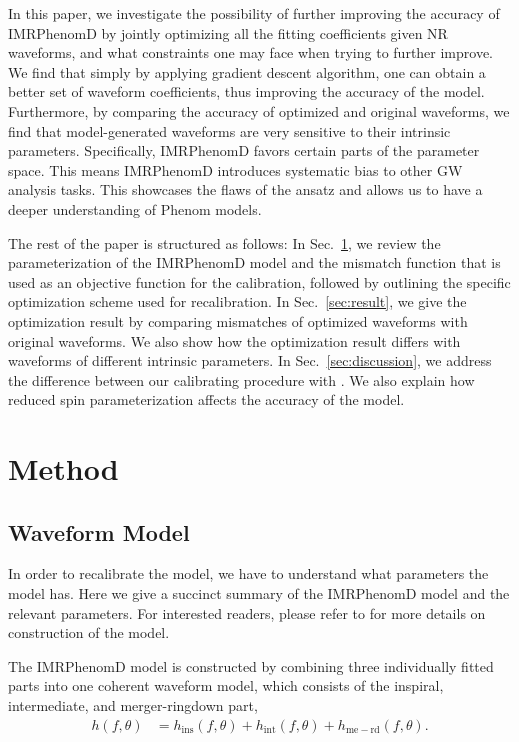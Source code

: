 \documentclass[twocolumn]{aastex631}
\begin{document}
In this paper, we investigate the possibility of further improving the accuracy
of IMRPhenomD by jointly optimizing all the fitting coefficients given NR
waveforms, and what constraints one may face when trying to further improve. We
find that simply by applying gradient descent algorithm, one can obtain a better
set of waveform coefficients, thus improving the accuracy of the model.
Furthermore, by comparing the accuracy of optimized and original waveforms, we
find that model-generated waveforms are very sensitive to their intrinsic
parameters. Specifically, IMRPhenomD favors certain parts of the parameter
space. This means IMRPhenomD introduces systematic bias to other GW analysis
tasks. This showcases the flaws of the ansatz and allows us to have a deeper
understanding of Phenom models.  

The rest of the paper is structured as follows: In Sec.~\ref{sec:method}, we
review the parameterization of the IMRPhenomD model and the mismatch function
that is used as an objective function for the calibration, followed by outlining the
specific optimization scheme used for recalibration. In
Sec.~\ref{sec:result}, we give the optimization result by comparing mismatches
of optimized waveforms with original waveforms. We also show how the
optimization result differs with waveforms of different intrinsic parameters. In
Sec.~\ref{sec:discussion}, we address the difference between our calibrating
procedure with \citep{khan2016frequency}. We also explain how reduced spin
parameterization affects the accuracy of the model. 

\section{Method} \label{sec:method}

\subsection{Waveform Model} \label{subsec:waveform_model}

In order to recalibrate the model, we have to understand what parameters the model has.
Here we give a succinct summary of the IMRPhenomD model and the relevant parameters.
For interested readers, please refer to \cite{khan2016frequency} for more details on construction of the model.


The IMRPhenomD model is constructed by combining three individually fitted parts
into one coherent waveform model, which consists of the inspiral, intermediate, and merger-ringdown part, 
\begin{align}
	h(f,\theta)&=h_{\mathrm{ins}}(f,\theta) + h_{\mathrm{int}}(f,\theta) + h_{\mathrm{me-rd}}(f,\theta).
\end{align}
\end{document}
